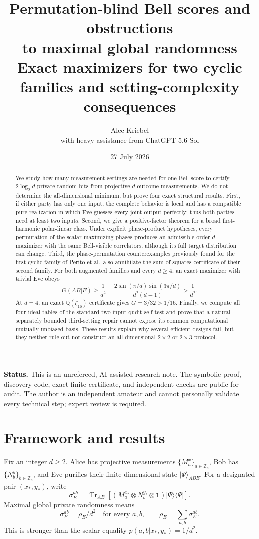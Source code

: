 \documentclass[11pt]{article}
\title{\vspace{-1.35cm}
\textbf{Permutation-blind Bell scores and obstructions}\\[-0.05em]
\textbf{to maximal global randomness}\\[0.45em]
\large Exact maximizers for two cyclic families and setting-complexity consequences}
\author{Alec Kriebel\\
\small with heavy assistance from ChatGPT 5.6 Sol}
\date{27 July 2026}
\theoremstyle{remark}
\newcommand{\Id}{\mathbf 1}
\newcommand{\Tr}{\operatorname{Tr}}
\begin{document}
\maketitle

\begin{abstract}
We study how many measurement settings are needed for one Bell score to
certify \(2\log_2d\) private random bits from projective \(d\)-outcome
measurements.  We do not determine the all-dimensional minimum, but prove
four exact structural results.  First, if either party has only one input,
the complete behavior is local and has a compatible pure realization in
which Eve guesses every joint output perfectly; thus both parties need at
least two inputs.  Second, we give a positive-factor theorem for a broad
first-harmonic polar-linear class.  Under explicit phase-product hypotheses,
every permutation of the scalar maximizing phases produces an admissible
order-\(d\) maximizer with the same Bell-visible correlators, although its
full target distribution can change.  Third, the phase-permutation
counterexamples previously found for the first cyclic family of Perito
et al.\ also annihilate the sum-of-squares certificate of their second
family.  For both augmented families and every \(d\geq4\), an exact
maximizer with trivial Eve obeys
\[
G(AB|E)\geq
\frac1{d^2}+
\frac{2\sin(\pi/d)\sin(3\pi/d)}{d^2(d-1)}
>\frac1{d^2}.
\]
At \(d=4\), an exact \(\mathbb Q(\zeta_{16})\) certificate gives
\(G=3/32>1/16\).  Finally, we compute all four ideal tables of the standard
two-input qudit self-test and prove that a natural separately bounded
third-setting repair cannot expose its common computational mutually
unbiased basis.  These results explain why several efficient designs fail,
but they neither rule out nor construct an all-dimensional \(2\times2\) or
\(2\times3\) protocol.
\end{abstract}

\medskip
\noindent\textbf{Status.}
This is an unrefereed, AI-assisted research note.  The symbolic proof,
discovery code, exact finite certificate, and independent checks are public
for audit.  The author is an independent amateur and cannot personally
validate every technical step; expert review is required.

\section{Framework and results}

Fix an integer \(d\geq2\).  Alice has projective measurements
\(\{M^x_a\}_{a\in\mathbb Z_d}\), Bob has
\(\{N^y_b\}_{b\in\mathbb Z_d}\), and Eve purifies their finite-dimensional
state \(\lvert\Psi\rangle_{ABE}\).  For a designated pair
\((x_*,y_*)\), write
\[
\sigma_E^{ab}
=
\Tr_{AB}\!\left[
(M^{x_*}_a\otimes N^{y_*}_b\otimes\Id)
\lvert\Psi\rangle\langle\Psi\rvert
\right].
\]
Maximal global private randomness means
\begin{equation}
\sigma_E^{ab}=\rho_E/d^2
\quad\text{for every }a,b,
\qquad
\rho_E=\sum_{a,b}\sigma_E^{ab}.
\label{eq:private}
\end{equation}
This is stronger than the scalar equality
\(p(a,b|x_*,y_*)=1/d^2\).
\end{document}
